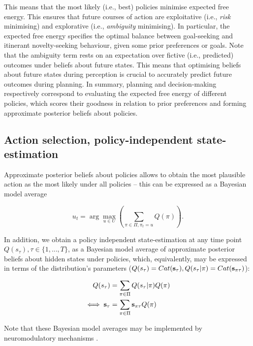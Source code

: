 \documentclass[review,12pt,authoryear]{elsarticle}
\begin{document}
This means that the most likely (i.e., best) policies minimise expected free energy. This ensures that future courses of action are exploitative (i.e., \textit{risk} minimising) and explorative (i.e., \textit{ambiguity} minimising). In particular, the expected free energy specifies the optimal balance between goal-seeking and itinerant novelty-seeking behaviour, given some prior preferences or goals. Note that the ambiguity term rests on an expectation over fictive (i.e., predicted) outcomes under beliefs about future states. This means that optimising beliefs about future states during perception is crucial to accurately predict future outcomes during planning. In summary, planning and decision-making respectively correspond to evaluating the expected free energy of different policies, which scores their goodness in relation to prior preferences and forming approximate posterior beliefs about policies.

\subsection{Action selection, policy-independent state-estimation}

Approximate posterior beliefs about policies allows to obtain the most plausible action as the most likely under all policies -- this can be expressed as a Bayesian model average

\begin{equation}
\label{eq: action selection}
    u_t = \arg \max_{u \in U } \left (\sum_{\pi \in \Pi , \pi_t =u} Q(\pi)\right).
\end{equation}

In addition, we obtain a policy independent state-estimation at any time point $Q(s_\tau),\tau \in \{1,...,T\}$, as a Bayesian model average of approximate posterior beliefs about hidden states under policies, which, equivalently, may be expressed in terms of the distribution's parameters ($Q(s_\tau)= Cat(\bold s_\tau),Q(s_\tau |\pi)= Cat(\bold s_{\pi\tau})$):

\begin{equation}
\label{eq: policy indep}
    \begin{split}
        Q(s_\tau) &= \sum_{\pi \in \Pi} Q(s_\tau |\pi)Q(\pi)\\
        \iff \bold s_\tau &= \sum_{\pi \in \Pi} \bold s_{\pi\tau} Q(\pi)
    \end{split}
\end{equation}

Note that these Bayesian model averages may be implemented by neuromodulatory mechanisms \citep{fitzgeraldModelAveragingOptimal2014}.
\end{document}
